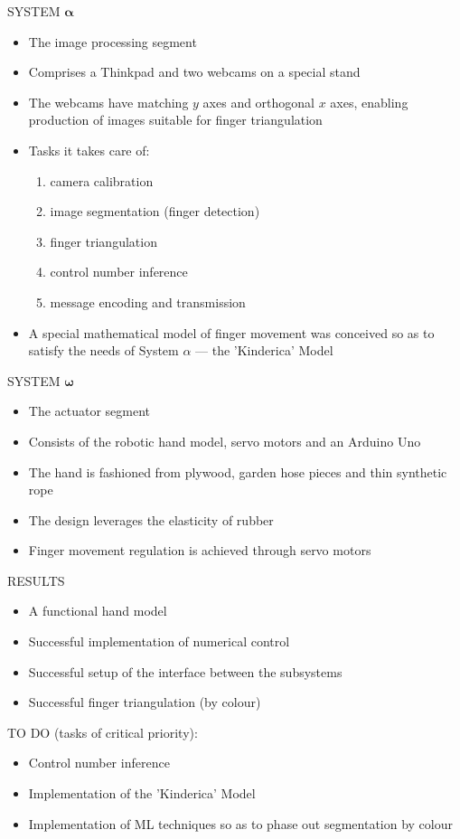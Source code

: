 \documentclass{beamer}
\begin{document}
\begin{frame}{SYSTEM $\bm{\alpha}$}
\begin{itemize}
\item The image processing segment
\item Comprises a Thinkpad and two webcams on a special stand
\item The webcams have matching $y$ axes and orthogonal $x$ axes, enabling production of images suitable for finger triangulation
\item Tasks it takes care of:
\begin{enumerate}
\item camera calibration
\item image segmentation (finger detection)
\item finger triangulation
\item control number inference
\item message encoding and transmission
\end{enumerate}
\item A special mathematical model of finger movement was conceived so as to satisfy the needs of System $\alpha$ --- the 'Kinderica' Model
\end{itemize}
\end{frame}

\begin{frame}{SYSTEM $\bm{\omega}$}
\begin{itemize}
\item The actuator segment
\item Consists of the robotic hand model, servo motors and an Arduino Uno
\item The hand is fashioned from plywood, garden hose pieces and thin synthetic rope
\item The design leverages the elasticity of rubber
\item Finger movement regulation is achieved through servo motors
\end{itemize}
\end{frame}

\begin{frame}{RESULTS}
\begin{itemize}
\item A functional hand model
\item Successful implementation of numerical control
\item Successful setup of the interface between the subsystems
\item Successful finger triangulation (by colour)
\end{itemize}
\vfill
TO DO (tasks of critical priority):
\begin{itemize}
\item Control number inference
\item Implementation of the 'Kinderica' Model
\item Implementation of ML techniques so as to phase out segmentation by colour
\end{itemize}
\end{frame}
\end{document}
